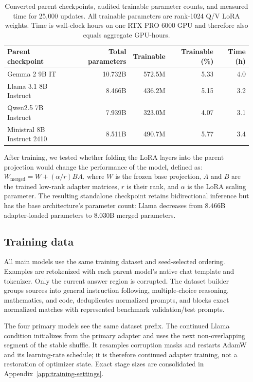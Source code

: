 \documentclass{article}
\begin{document}
\begin{table}[t]
\caption{Converted parent checkpoints, audited trainable parameter counts, and measured time for 25,000 updates. All trainable parameters are rank-1024 Q/V LoRA weights. Time is wall-clock hours on one RTX PRO 6000 GPU and therefore also equals aggregate GPU-hours.}
\label{tab:models}
\centering
\small
\begin{tabular}{lrrrr}
\toprule
Parent checkpoint & Total parameters & Trainable & Trainable (\%) & Time (h) \\
\midrule
Gemma 2 9B IT & 10.732B & 572.5M & 5.33 & 4.0 \\
Llama 3.1 8B Instruct & 8.466B & 436.2M & 5.15 & 3.2 \\
Qwen2.5 7B Instruct & 7.939B & 323.0M & 4.07 & 3.1 \\
Ministral 8B Instruct 2410 & 8.511B & 490.7M & 5.77 & 3.4 \\
\bottomrule
\end{tabular}
\end{table}

After training, we tested whether folding the LoRA layers into the parent projection would change the performance of the model, defined as: $W_{\mathrm{merged}}=W+(\alpha/r)BA$, where $W$ is the frozen base projection, $A$ and $B$ are the trained low-rank adapter matrices, $r$ is their rank, and $\alpha$ is the LoRA scaling parameter. The resulting standalone checkpoint retains bidirectional inference but has the base architecture's parameter count: Llama decreases from 8.466B adapter-loaded parameters to 8.030B merged parameters.

\subsection{Training data}

All main models use the same training dataset and seed-selected ordering. Examples are retokenized with each parent model's native chat template and tokenizer. Only the current answer region is corrupted. The dataset builder groups sources into general instruction following, multiple-choice reasoning, mathematics, and code, deduplicates normalized prompts, and blocks exact normalized matches with represented benchmark validation/test prompts.

The four primary models see the same dataset prefix. The continued Llama condition initializes from the primary adapter and uses the next non-overlapping segment of the stable shuffle. It resamples corruption masks and restarts AdamW and its learning-rate schedule; it is therefore continued adapter training, not a restoration of optimizer state. Exact stage sizes are consolidated in Appendix~\ref{app:training-settings}.
\end{document}
